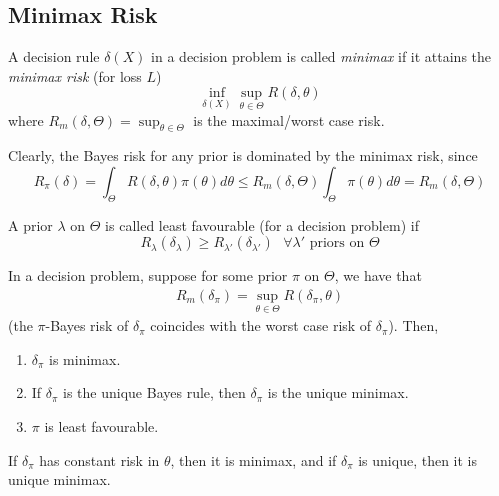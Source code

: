 \documentclass[a4paper]{article}
\begin{document}
\subsection{Minimax Risk}

\begin{defn}
	A decision rule $\delta(X)$ in a decision problem is called \textit{minimax} if it attains the \textit{minimax risk} (for loss $L$)
	\[
		\inf_{\delta(X)} \sup_{\theta \in \Theta} R(\delta, \theta)
	\]
	where $R_{m}(\delta, \Theta) = \sup_{\theta \in \Theta}$ is the maximal/worst case risk.
\end{defn}

Clearly, the Bayes risk for any prior is dominated by the minimax risk, since
\[
	R_{\pi}(\delta) = \int_{\Theta} R(\delta,\theta) \pi(\theta) d\theta \le R_{m}(\delta, \Theta) \int_{\Theta} \pi(\theta) d\theta = R_{m}(\delta, \Theta)
\] 

A prior $\lambda$ on $\Theta$ is called least favourable (for a decision problem) if
\[
	R_{\lambda}(\delta_{\lambda}) \ge R_{\lambda'}(\delta_{\lambda'}) \text{ } \forall \lambda' \text{ priors on } \Theta
\] 

\begin{prop}
	In a decision problem, suppose for some prior $\pi$ on $\Theta$, we have that 
	\begin{align*}
		R_{m}(\delta_{\pi}) = \sup_{\theta \in  \Theta} R(\delta_{\pi}, \theta)
	\end{align*}
	(the $\pi$-Bayes risk of $\delta_{\pi}$ coincides with the worst case risk of $\delta_{\pi}$).
	Then,

	\begin{enumerate}[label=\roman*)]
		\item $\delta_{\pi}$ is minimax.

		\item If $\delta_{\pi}$ is the unique Bayes rule, then $\delta_{\pi}$ is the unique minimax.

		\item $\pi$ is least favourable.
		
	\end{enumerate}
\end{prop}

\begin{corol}
	If $\delta_{\pi}$ has constant risk in $\theta$, then it is minimax, and if $\delta_{\pi}$ is unique, then it is unique minimax.
\end{corol}
\end{document}

